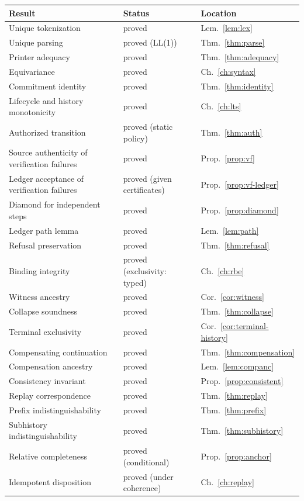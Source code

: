 \documentclass[11pt,openany]{book}
\theoremstyle{remark}
\begin{document}
{\small
\begin{longtable}{L{6.2cm}L{4.4cm}l}
\toprule
Result & Status & Location\\
\midrule
\endhead
Unique tokenization & proved & Lem.~\ref{lem:lex}\\
Unique parsing & proved (LL(1)) & Thm.~\ref{thm:parse}\\
Printer adequacy & proved & Thm.~\ref{thm:adequacy}\\
Equivariance & proved & Ch.~\ref{ch:syntax}\\
Commitment identity & proved & Thm.~\ref{thm:identity}\\
Lifecycle and history monotonicity & proved & Ch.~\ref{ch:lts}\\
Authorized transition & proved (static policy) & Thm.~\ref{thm:auth}\\
Source authenticity of verification failures & proved & Prop.~\ref{prop:vf}\\
Ledger acceptance of verification failures & proved (given certificates) & Prop.~\ref{prop:vf-ledger}\\
Diamond for independent steps & proved & Prop.~\ref{prop:diamond}\\
Ledger path lemma & proved & Lem.~\ref{lem:path}\\
Refusal preservation & proved & Thm.~\ref{thm:refusal}\\
Binding integrity & proved (exclusivity: typed) & Ch.~\ref{ch:rbe}\\
Witness ancestry & proved & Cor.~\ref{cor:witness}\\
Collapse soundness & proved & Thm.~\ref{thm:collapse}\\
Terminal exclusivity & proved & Cor.~\ref{cor:terminal-history}\\
Compensating continuation & proved & Thm.~\ref{thm:compensation}\\
Compensation ancestry & proved & Lem.~\ref{lem:companc}\\
Consistency invariant & proved & Prop.~\ref{prop:consistent}\\
Replay correspondence & proved & Thm.~\ref{thm:replay}\\
Prefix indistinguishability & proved & Thm.~\ref{thm:prefix}\\
Subhistory indistinguishability & proved & Thm.~\ref{thm:subhistory}\\
Relative completeness & proved (conditional) & Prop.~\ref{prop:anchor}\\
Idempotent disposition & proved (under coherence) & Ch.~\ref{ch:replay}\\

\end{longtable}}
\end{document}
